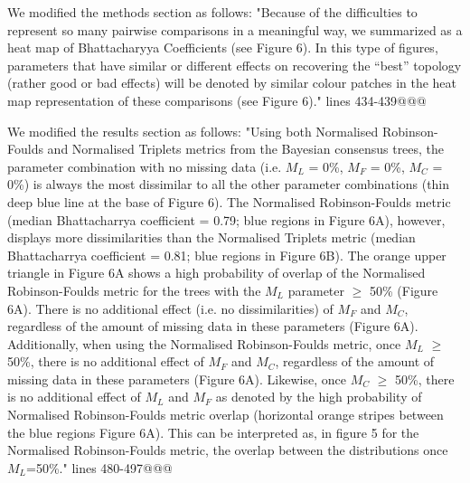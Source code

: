 \documentclass[12pt,letterpaper]{article}
\begin{document}
\begin{enumerate}
We modified the methods section as follows:
"Because of the difficulties to represent so many pairwise comparisons in a meaningful way, we summarized as a heat map of Bhattacharyya Coefficients (see Figure 6).
In this type of figures, parameters that have similar or different effects on recovering the ``best'' topology (rather good or bad effects) will be denoted by similar colour patches in the heat map representation of these comparisons (see Figure 6)." lines 434-439@@@

We modified the results section as follows:
"Using both Normalised Robinson-Foulds and Normalised Triplets metrics from the Bayesian consensus trees, the parameter combination with no missing data (i.e. $M_{L}$ = 0\%, $M_{F}$ = 0\%, $M_{C}$ = 0\%) is always the most dissimilar to all the other parameter combinations (thin deep blue line at the base of Figure 6).
The Normalised Robinson-Foulds metric (median Bhattacharrya coefficient = 0.79; blue regions in Figure 6A), however, displays more dissimilarities than the Normalised Triplets metric (median Bhattacharrya coefficient = 0.81; blue regions in Figure 6B).
The orange upper triangle in Figure 6A shows a high probability of overlap of the Normalised Robinson-Foulds metric for the trees with the $M_{L}$ parameter $\geq$ 50\% (Figure 6A).
There is no additional effect (i.e. no dissimilarities) of $M_{F}$ and $M_{C}$, regardless of the amount of missing data in these parameters (Figure 6A).
Additionally, when using the Normalised Robinson-Foulds metric, once $M_{L}$ $\geq$ 50\%, there is no additional effect of $M_{F}$ and $M_{C}$, regardless of the amount of missing data in these parameters (Figure 6A).
Likewise, once $M_{C}$ $\geq$ 50\%, there is no additional effect of $M_{L}$ and $M_{F}$ as denoted by the high probability of Normalised Robinson-Foulds metric overlap (horizontal orange stripes between the blue regions Figure 6A).
This can be interpreted as, in figure 5 for the Normalised Robinson-Foulds metric, the overlap between the distributions once $M_L$=50\%." lines 480-497@@@


\end{enumerate}
\end{document}
